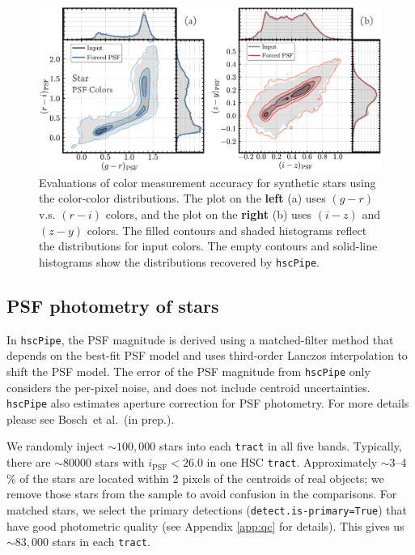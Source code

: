 \documentclass[useamsfonts]{pasj01}
\def\etal{{\ et al.~}}
\def\hscpipe{\texttt{hscPipe}}
\def\tract{\texttt{tract}}
\begin{document}
\begin{figure}
    \begin{center}
        \includegraphics[width=\textwidth]{fig/synpipe_psf_cdist}
    \end{center}
    \caption{
        Evaluations of color measurement accuracy for synthetic stars using
        the color-color distributions.
        The plot on the \textbf{left} (a) uses $(g-r)$ v.s. $(r-i)$ colors, and the plot 
        on the \textbf{right} (b) uses $(i-z)$ and $(z-y)$ colors.
        The filled contours and shaded histograms reflect the distributions for input
        colors.
        The empty contours and solid-line histograms show the distributions recovered
        by \hscpipe{}.
        }
    \label{fig:psf_cdist}
\end{figure}

\subsection{PSF photometry of stars}
    \label{ssec:psf}

    In \hscpipe{}, the PSF magnitude is derived using a matched-filter method that
    depends on the best-fit PSF model and uses third-order Lanczos interpolation to 
    shift the PSF model.
    The error of the PSF magnitude from \hscpipe{} only considers the per-pixel noise,
    and does not include centroid uncertainties.
    \hscpipe{} also estimates aperture correction for PSF photometry.
    For more details please see Bosch\etal (in prep.).

    We randomly inject ${\sim}100,000$ stars into each \tract{} in all five bands. 
    Typically, there are ${\sim}80000$ stars with $i_{\mathrm{PSF}}<26.0$ in one HSC 
    \tract{}. 
    Approximately ${\sim}3$--$4$\% of the stars are located within 2 pixels of the 
    centroids of real objects; we remove those stars from the sample to avoid confusion 
    in the comparisons.
    For matched stars, we select the primary detections 
    (\texttt{detect.is-primary=True}) that have good photometric quality
    (see Appendix \ref{app:qc} for details).
    This gives us ${\sim}83,000$ stars in each \tract{}.
\end{document}
